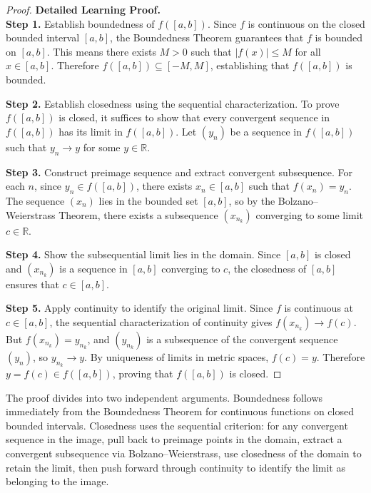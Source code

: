 \begin{proof}
\textbf{Detailed Learning Proof.}~\\

\textbf{Step 1.} Establish boundedness of $f([a,b])$. Since $f$ is continuous on the closed bounded interval $[a,b]$, the Boundedness Theorem guarantees that $f$ is bounded on $[a,b]$. This means there exists $M > 0$ such that $|f(x)| \leq M$ for all $x \in [a,b]$. Therefore $f([a,b]) \subseteq [-M, M]$, establishing that $f([a,b])$ is bounded.

\textbf{Step 2.} Establish closedness using the sequential characterization. To prove $f([a,b])$ is closed, it suffices to show that every convergent sequence in $f([a,b])$ has its limit in $f([a,b])$. Let $(y_n)$ be a sequence in $f([a,b])$ such that $y_n \to y$ for some $y \in \mathbb{R}$.

\textbf{Step 3.} Construct preimage sequence and extract convergent subsequence. For each $n$, since $y_n \in f([a,b])$, there exists $x_n \in [a,b]$ such that $f(x_n) = y_n$. The sequence $(x_n)$ lies in the bounded set $[a,b]$, so by the Bolzano--Weierstrass Theorem, there exists a subsequence $(x_{n_k})$ converging to some limit $c \in \mathbb{R}$.

\textbf{Step 4.} Show the subsequential limit lies in the domain. Since $[a,b]$ is closed and $(x_{n_k})$ is a sequence in $[a,b]$ converging to $c$, the closedness of $[a,b]$ ensures that $c \in [a,b]$.

\textbf{Step 5.} Apply continuity to identify the original limit. Since $f$ is continuous at $c \in [a,b]$, the sequential characterization of continuity gives $f(x_{n_k}) \to f(c)$. But $f(x_{n_k}) = y_{n_k}$, and $(y_{n_k})$ is a subsequence of the convergent sequence $(y_n)$, so $y_{n_k} \to y$. By uniqueness of limits in metric spaces, $f(c) = y$. Therefore $y = f(c) \in f([a,b])$, proving that $f([a,b])$ is closed.
\end{proof}

\begin{remark*}
The proof divides into two independent arguments. Boundedness follows immediately from the Boundedness Theorem for continuous functions on closed bounded intervals. Closedness uses the sequential criterion: for any convergent sequence in the image, pull back to preimage points in the domain, extract a convergent subsequence via Bolzano--Weierstrass, use closedness of the domain to retain the limit, then push forward through continuity to identify the limit as belonging to the image.
\end{remark*}

